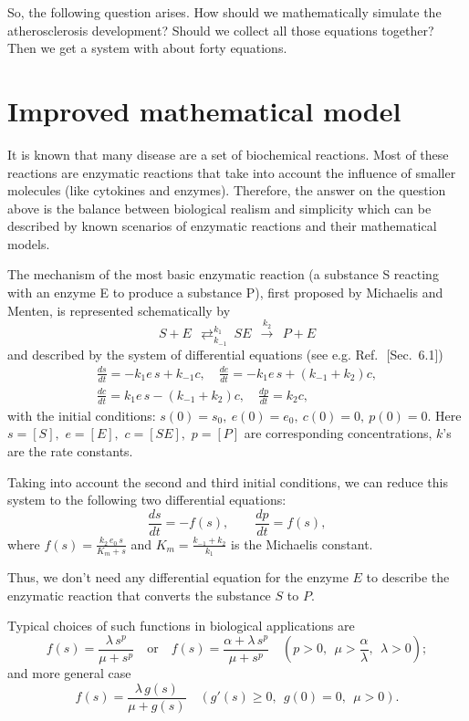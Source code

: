 \documentclass[reqno]{amsart}            %
\numberwithin{equation}{section}
\begin{document}
So, the following  question arises. How  should we mathematically simulate the atherosclerosis development?
Should we collect all those equations together? Then we get a system with about forty equations.


\section{Improved mathematical model}\label{Sec3}

It is known that many disease are a set of biochemical reactions.
Most of these reactions are enzymatic reactions that take into account the influence of smaller molecules  (like cytokines and enzymes).
Therefore, the answer on the question above is the balance between biological  realism and simplicity which can be described by
known scenarios of enzymatic reactions and their mathematical models.

The mechanism of the most basic enzymatic reaction (a substance S reacting with an enzyme E to produce a substance P),
first proposed by Michaelis and Menten\cite{MichMenten}, is represented schematically by
$$
S + E \ \ {\rightleftarrows}^{k_1}_{k_{-1}} \ SE \ \ \stackrel{k_2}{\longrightarrow}\ \ P + E
$$
and described by the system of differential equations (see e.g. Ref.~\cite{Murray}\,[Sec.~6.1])
\begin{gather*}
\frac{ds}{dt}= - k_1  e \, s + k_{-1} c , \quad \frac{de}{dt}= - k_1  e\, s + (k_{-1} + k_2) c ,
\\
\frac{dc}{dt}=  k_1  e\, s - (k_{-1} + k_2) c , \quad \frac{dp}{dt}=  k_2 c,
\end{gather*}
with the initial conditions: $s(0)=s_0, \ e(0)=e_0, \ c(0)=0, \ p(0)=0.$
Here $s=[S],$ $e=[E],$ $c=[SE],$ $p=[P]$ are corresponding concentrations,  $k$'s are the rate constants.

Taking into account the second and third initial conditions, we can reduce this system to the following two differential equations:
$$
\frac{ds}{dt} = - f(s),\qquad \frac{dp}{dt} = f(s),
$$
where $\displaystyle{f(s)=\frac{k_2 \, e_0 \, s}{K_m + s}}$ and   $\displaystyle{K_m=\frac{k_{-1}+ k_2}{k_1}}$ is the Michaelis constant.

Thus, we don't need any differential equation for the enzyme $E$
to describe the enzymatic reaction that  converts the substance $S$ to $P.$

Typical choices of such functions in biological applications are
\begin{equation}\label{enzym-functions-1}
  f(s)= \frac{\lambda \, s^p}{\mu + s^p} \quad \text{or} \quad f(s)= \frac{\alpha + \lambda \, s^p}{\mu + s^p} \quad (p > 0,  \ \ \mu > \frac{\alpha}{\lambda}, \ \ \lambda >0);
\end{equation}
and more general case
\begin{equation}\label{enzym-functions-2}
f(s)= \frac{\lambda \, g(s)}{\mu + g(s)}   \quad (g'(s) \ge 0, \ \ g(0)=0, \ \ \mu >0).
\end{equation}
\end{document}
